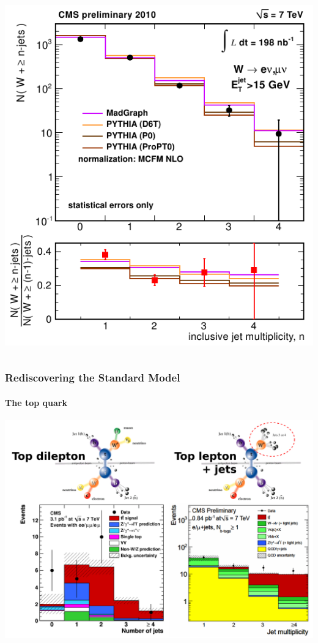 \documentclass[compress]{beamer}
\begin{document}
\begin{frame}
\begin{columns}
\begin{center}
\includegraphics[width=\linewidth]{WplusJets.png}
\end{center}
\end{columns}
\end{frame}

\begin{frame}
\frametitle{Rediscovering the Standard Model}
\framesubtitle{The top quark}
\includegraphics[width=\linewidth]{top.pdf}
\end{frame}
\end{document}

